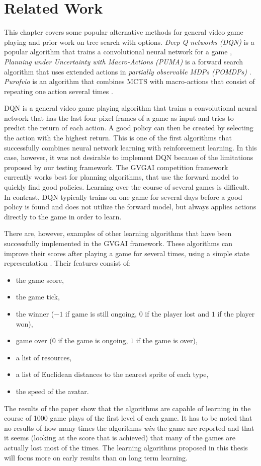 \chapter{Related Work}
\label{sec:related}
This chapter covers some popular alternative methods for general video game
playing and prior work on tree search with options. \emph{Deep Q networks (DQN)}
is a popular algorithm that trains a convolutional neural network for a game
\cite{mnih2013playing}, \emph{Planning under Uncertainty with Macro-Actions
(PUMA)} is a forward search algorithm that uses extended actions in
\emph{partially observable MDPs (POMDPs)} \cite{he2010puma}.  \emph{Purofvio} is
an algorithm that combines MCTS with macro-actions that consist of repeating one
action several times \cite{powley2012monte}.

DQN is a general video game playing algorithm that trains a convolutional neural
network that has the last four pixel frames of a game as input and tries to
predict the return of each action. A good policy can then be created by
selecting the action with the highest return. This is one of the first
algorithms that successfully combines neural network learning with reinforcement
learning. In this case, however, it was not desirable to implement DQN because
of the limitations proposed by our testing framework. The GVGAI competition
framework currently works best for planning algorithms, that use the forward
model to quickly find good policies. Learning over the course of several games
is difficult. In contrast, DQN typically trains on one game for several days
before a good policy is found and does not utilize the forward model, but always
applies actions directly to the game in order to learn.

There are, however, examples of other learning algorithms that have been successfully
implemented in the GVGAI framework. These 
algorithms can improve their scores after playing a game for several times,
using a simple state representation \cite{samothrakis2015neuroevolution}. Their
features consist of: 
\begin{itemize}%
	\item the game score, 
	\item the game tick,
	\item the winner ($-1$ if game is still ongoing, $0$ if the player lost and
		$1$ if the player won), 
	\item game over ($0$ if the game is ongoing, $1$ if the game is over), 
	\item a list of resources, 
	\item a list of Euclidean distances to the nearest sprite of each type,
	\item the speed of the avatar. 
\end{itemize}
The results of the paper show that the algorithms are capable of learning in the
course of 1000 game plays of the first level of each game. It has to be noted
that no results of how many times the algorithms \emph{win} the game are
reported and that it seems (looking at the score that is achieved) that many of
the games are actually lost most of the times. The learning algorithms proposed
in this thesis will focus more on early results than on long term learning.

